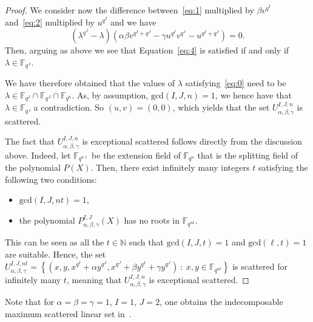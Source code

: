 \begin{proof}
We consider now the difference between~\eqref{eq:1} multiplied by $\beta v^{q^I}$ and~\eqref{eq:2} multiplied by $u^{q^I}$ and we have
\begin{equation}
\label{eq:4}
    \left(\lambda^{q^J} - \lambda\right)\left(\alpha\beta v^{q^I + q^J} -\gamma u^{q^I}v^{q^J} - u^{q^I + q^J}\right) = 0.
\end{equation}
Then, arguing as above we see that Equation~\eqref{eq:4} is satisfied if and only if $\lambda\in \mathbb{F}_{q^J}$.

We have therefore obtained that the values of $\lambda$ satisfying~\eqref{eq:0}
need to be $\lambda\in \mathbb{F}_{q^I}\cap \mathbb{F}_{q^J}\cap \mathbb{F}_{q^n}$. As, by assumption, $\mathrm{gcd}(I,J,n)=1$, we hence have that $\lambda\in \mathbb{F}_q$, a contradiction. So $(u,v)=(0,0)$, which yields that the set $U_{\alpha, \beta, \gamma}^{I,J,n}$ is scattered.

The fact that $U_{\alpha, \beta, \gamma}^{I,J,n}$ is exceptional scattered follows directly from the discussion above. Indeed, let $\mathbb{F}_{q^{n\ell}}$ be the extension field of $\mathbb{F}_{q^n}$ that is the splitting field of the polynomial $P(X)$. Then, there exist infinitely many integers $t$ satisfying the following two conditions:
\begin{itemize}
    \item $\mathrm{gcd}(I,J,nt)=1$,
    \item the polynomial $P^{I,J}_{\alpha,\beta,\gamma}(X)$ has no roots in $\mathbb{F}_{q^{nt}}$.
\end{itemize}
 This can be seen as all the $t\in \mathbb{N}$ such that $\mathrm{gcd}(I,J,t)=1$ and $\mathrm{gcd}(\ell,t)=1$ are suitable. Hence, the set $U_{\alpha, \beta, \gamma}^{I,J,nt} = \left\{\left(x,y,x^{q^I}+\alpha y^{q^J},x^{q^J}+\beta y^{q^I} + \gamma y^{q^J}\right) \ : \ x,y\in \mathbb{F}_{q^{nt}}\right\}$ is scattered for infinitely many $t$, meaning that $U_{\alpha, \beta, \gamma}^{I,J,n}$ is exceptional scattered. 
\end{proof}
Note that for $\alpha=\beta=\gamma=1$, $I=1$, $J=2$,
one obtains the indecomposable maximum scattered linear set in~\cite{BMN2022}.

